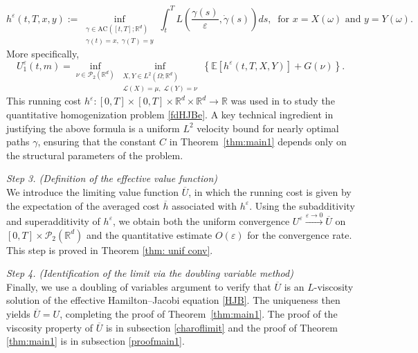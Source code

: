 \documentclass[reqno,11pt]{amsart}
\numberwithin{equation}{section}
\newcommand{\be}{\begin{equation}}
\newcommand{\ee}{\end{equation}}
\newcommand{\R}{\mathbb{R}} %
\newcommand{\e}{\varepsilon}
\newcommand{\nd}{\noindent}
\renewcommand{\bar}{\overline}
\begin{document}
    \be\label{cost}
    h^\e(t,T,x,y):= \inf_{\substack{\gamma\in \text{AC}([t,T];\R^d)\\ \gamma(t)=x,\;\gamma(T)=y}} \int_t^TL\left(\frac{\gamma(s)}{\e},\dot{\gamma}(s)\right)ds,\;\;\text{for }x=X(\omega)\text{ and } y=Y(\omega).
    \ee
    More specifically,
    \be\label{importanteq}
    U^\e_1(t,m)=\inf_{\nu\in \mathcal{P}_2(\R^d)}\inf_{\substack{X,Y\in L^2(\Omega;\R^d)\\ \mathcal{L}(X)=\mu,\;\mathcal{L}(Y)=\nu}}\left\{ \mathbb{E}[h^\e(t,T,X,Y)]+G(\nu)  \right\}.
    \ee
    This running cost $h^\e\colon [0,T]\times [0,T]\times\R^d\times\R^d\to \R$ was used in \cite{TranYu2021} to study the quantitative homogenization problem \eqref{fdHJBe}. A key technical ingredient in justifying the above formula is a uniform $L^2$ velocity bound for nearly optimal paths $\gamma$, ensuring that the constant $C$ in Theorem~\ref{thm:main1} depends only on the structural parameters of the problem.

    \vspace{2mm}

    \nd
    \textit{Step 3. (Definition of the effective value function)}\\
    We introduce the limiting value function $\bar{U}$, in which the running cost is given by the expectation of the averaged cost $\bar{h}$ associated with $h^\e$. Using the subadditivity and superadditivity of $h^\e$, we obtain both the uniform convergence $U^\varepsilon \xrightarrow{\e\to 0} \bar{U}$ on $[0,T]\times\mathcal{P}_2(\R^d)$ and
    the quantitative estimate $O(\varepsilon)$ for the convergence rate. This step is proved in Theorem \ref{thm: unif conv}.
    \vspace{2mm}

    \nd
    \textit{Step 4. (Identification of the limit via the doubling variable method)}\\
    Finally, we use a doubling of variables argument to verify that $\bar{U}$ is an $L$-viscosity solution of the effective Hamilton--Jacobi equation \eqref{HJB}. The uniqueness then yields $\bar{U}=U$, completing the proof of Theorem~\ref{thm:main1}. The proof of the viscosity property of $\overline{U}$ is in subsection \ref{charoflimit} and the proof of Theorem \ref{thm:main1} is in subsection \ref{proofmain1}.
    \vspace{1mm}
\end{document}
